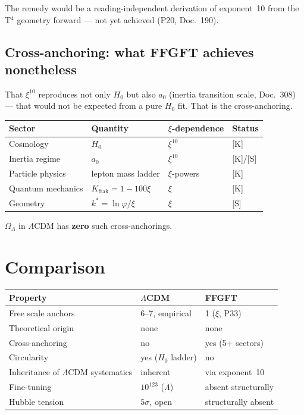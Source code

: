 The remedy would be a reading-independent derivation of exponent~10
from the T$^4$ geometry forward — not yet achieved (P20, Doc.~190).

\section{Cross-anchoring: what FFGFT achieves nonetheless}

That $\xi^{10}$ reproduces not only $H_0$ but also $a_0$ (inertia
transition scale, Doc.~308) — that would not be expected from a pure
$H_0$ fit. That is the cross-anchoring.

\begin{center}
\begin{tabular}{llll}
\toprule
Sector & Quantity & $\xi$-dependence & Status \\
\midrule
Cosmology & $H_0$ & $\xi^{10}$ & [K] \\
Inertia regime & $a_0$ & $\xi^{10}$ & [K]/[S] \\
Particle physics & lepton mass ladder & $\xi$-powers & [K] \\
Quantum mechanics & $K_\text{frak} = 1-100\xi$ & $\xi$ & [K] \\
Geometry & $k^* = \ln\varphi/\xi$ & $\xi$ & [S] \\
\bottomrule
\end{tabular}
\end{center}

$\Omega_\Lambda$ in $\Lambda$CDM has \textbf{zero} such cross-anchorings.

\chapter{Comparison}

\begin{center}
\begin{tabular}{lll}
\toprule
Property & $\Lambda$CDM & FFGFT \\
\midrule
Free scale anchors & 6--7, empirical & 1 ($\xi$, P33) \\
Theoretical origin & none & none \\
Cross-anchoring & no & yes (5+ sectors) \\
Circularity & yes ($H_0$ ladder) & no \\
Inheritance of $\Lambda$CDM systematics & inherent & via exponent~10 \\
Fine-tuning & $10^{123}$ ($\Lambda$) & absent structurally \\
Hubble tension & $5\sigma$, open & structurally absent \\
\bottomrule
\end{tabular}
\end{center}

